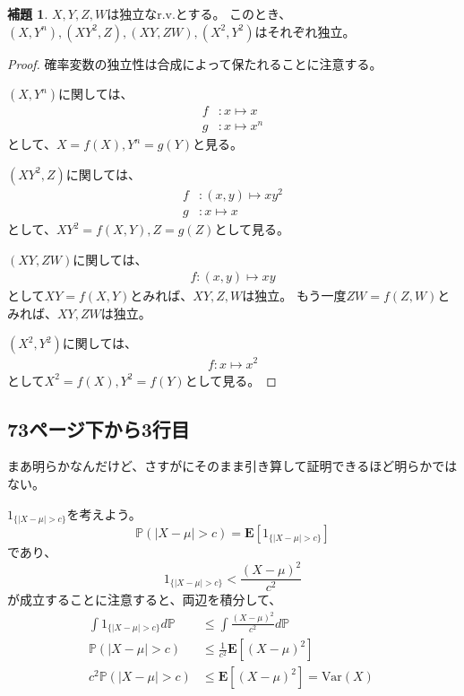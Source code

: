 \documentclass[11pt, a4paper]{jsarticle}
\theoremstyle{definition}
\newtheorem*{lem*}{補題}
\newcommand{\PP}{{\mathbb{P}}} %
\newcommand{\EE}{{\mathbf{E}}} %
\newcommand{\Var}{{\text{Var}}} %
\begin{document}
      \begin{lem*}
        $X,Y,Z,W$は独立なr.v.とする。
        このとき、$(X,Y^n),(XY^2,Z),(XY,ZW),(X^2,Y^2)$はそれぞれ独立。
      \end{lem*}
      \begin{proof}
        確率変数の独立性は合成によって保たれることに注意する。

        $(X,Y^n)$に関しては、
        \begin{align*}
          f &\colon x \mapsto x \\
          g &\colon x \mapsto x^n
        \end{align*}
        として、$X = f(X), Y^n = g(Y)$と見る。

        $(XY^2,Z)$に関しては、
        \begin{align*}
          f &\colon (x, y) \mapsto xy^2 \\
          g &\colon x \mapsto x
        \end{align*}
        として、$XY^2 = f(X,Y), Z = g(Z)$として見る。

        $(XY,ZW)$に関しては、
        \begin{align*}
          f \colon (x, y) \mapsto xy
        \end{align*}
        として$XY = f(X,Y)$とみれば、$XY,Z,W$は独立。
        もう一度$ZW = f(Z,W)$とみれば、$XY,ZW$は独立。

        $(X^2,Y^2)$に関しては、
        \begin{align*}
          f \colon x \mapsto x^2
        \end{align*}
        として$X^2 = f(X), Y^2 = f(Y)$として見る。
      \end{proof}

    \subsection{73ページ下から3行目}
      まあ明らかなんだけど、さすがにそのまま引き算して証明できるほど明らかではない。

      $1_{\{|X - \mu| > c\}}$を考えよう。
      \[
        \PP(|X - \mu| > c) = \EE[1_{\{|X - \mu| > c\}}]
      \]
      であり、
      \[
        1_{\{|X - \mu| > c\}} < \frac{(X - \mu)^2}{c^2}
      \]
      が成立することに注意すると、両辺を積分して、
      \begin{align*}
        \int 1_{\{|X - \mu| > c\}} d\PP &\leq \int \frac{(X - \mu)^2}{c^2} d\PP \\
        \PP(|X - \mu| > c) & \leq \frac{1}{c^2}\EE[(X - \mu)^2] \\
        c^2 \PP(|X - \mu| > c) & \leq \EE[(X - \mu)^2] = \Var(X)\
      \end{align*}
\end{document}

